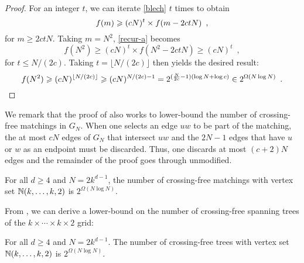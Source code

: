 \documentclass[12pt]{article}
\newcommand{\n}{N}
\begin{document}
\begin{proof}
  For an integer $t$, we can iterate \eqref{blech} $t$ times to obtain
  \begin{equation}
     f(m) \ge (c\n)^t\times f(m-2ct\n) \enspace ,
     \eqlabel{recur-a}
  \end{equation} 
  for $m\ge 2ct\n$.  Taking $m=\n^2$, \eqref{recur-a} becomes
  \[
     f(\n^2) \ge (c\n)^t\times f(\n^2-2ct\n) \ge (c\n)^t \enspace ,
  \]
  for $t \le\n/(2c)$.  Taking $t=\lfloor \n/(2c)\rfloor$ then yields the
  desired result:
  \[
     f(\n^2) \ge (c\n)^{\lfloor\n/(2c)\rfloor} 
            \ge (c\n)^{\n/(2c) - 1} 
            = 2^{(\frac{\n}{2c}-1)(\log\n+\log c)}
            \in 2^{\Omega(\n\log\n)} \enspace . \qedhere
  \]
\end{proof}

We remark that the proof of  also works to lower-bound
the number of crossing-free matchings in $G_\n$.  When one selects
an edge $uw$ to be part of the matching, the at most $c\n$ edges of
$G_\n$ that intersect $uw$ and the $2\n-1$ edges that have $u$ or $w$
as an endpoint must be discarded.  Thus, one discards at most $(c+2)\n$
edges and the remainder of the proof goes through unmodified.

\begin{cor}
  For all $d\ge 4$ and $\n=2k^{d-1}$, the number of crossing-free matchings
  with vertex set $\mathbb{N}(k,\ldots,k,2)$ is $2^{\Omega(\n\log\n)}$.
\end{cor}

From , we can derive a lower-bound on the number of
crossing-free spanning trees of the $k\times\cdots\times k\times 2$ grid:
\begin{cor}
  For all $d\ge 4$ and $\n=2k^{d-1}$.  The number of crossing-free trees with
  vertex set $\mathbb{N}(k,\ldots,k,2)$ is $2^{\Omega(\n\log\n)}$.
\end{cor}
\end{document}
